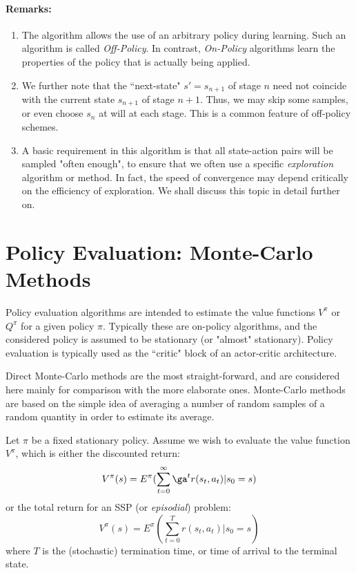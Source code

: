 \paragraph{Remarks:}
\begin{enumerate}
  \item The algorithm allows the use of an arbitrary policy during learning.
Such an algorithm is called {\em Off-Policy}. In contrast, {\em On-Policy}
algorithms learn the properties of the policy that is actually being applied.
  \item We further note that the ``next-state" $s'=s_{n+1}$ of stage $n$ need not
coincide with the current state $s_{n+1}$ of stage $n+1$. Thus, we may skip
some samples, or even choose $s_n$ at will at each stage. This is a common
feature of off-policy schemes.
  \item A basic requirement in this algorithm is that all state-action pairs will
be sampled "often enough", to ensure that we often use a specific
{\em exploration} algorithm or method. In fact, the speed of convergence
may depend critically on the efficiency of exploration. We shall discuss this
topic in detail further on.
\end{enumerate}

\section{Policy Evaluation: Monte-Carlo Methods}

Policy evaluation algorithms are intended to estimate the value functions
$V^\pi$ or $Q^\pi$ for a given policy $\pi$. Typically these are on-policy
algorithms, and the considered policy is assumed to be stationary (or "almost"
stationary). Policy evaluation is typically used as the ``critic" block of an
actor-critic architecture.

Direct Monte-Carlo methods are the most straight-forward, and are considered
here mainly for comparison with the more elaborate ones. Monte-Carlo methods
are based on the simple idea of averaging a number of random samples of a
random quantity in order to estimate its average.

Let $\pi$ be a fixed stationary policy. Assume we wish to evaluate the
value function $V^\pi$, which is either the discounted return:
$$
V^\pi(s) = E^\pi (\sum_{t=0}^\infty \ga^t r (s_t, a_t) | s_0=s)
$$
or the total return for an SSP (or {\em episodial}) problem:
$$
V^\pi(s) = E^\pi (\sum_{t=0}^T r(s_t, a_t)| s_0=s )
$$
where $T$ is the (stochastic) termination time, or time of arrival to
the terminal state.

